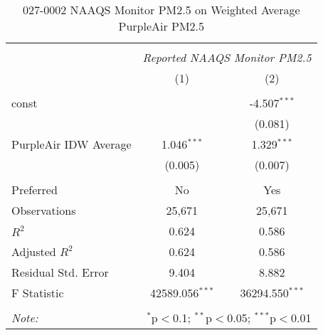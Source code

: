 \begin{table}[!htbp] \centering
  \caption{027-0002 NAAQS Monitor PM2.5 on Weighted Average PurpleAir PM2.5}
  \label{tab:reg_027-0002}
\begin{tabular}{@{\extracolsep{5pt}}lcc}
\\[-1.8ex]\hline
\hline \\[-1.8ex]
& \multicolumn{2}{c}{\textit{Reported NAAQS Monitor PM2.5}} \
\cr \cline{2-3}
\\[-1.8ex] & (1) & (2) \\
\hline \\[-1.8ex]
 const & & -4.507$^{***}$ \\
  & & (0.081) \\
 PurpleAir IDW Average & 1.046$^{***}$ & 1.329$^{***}$ \\
  & (0.005) & (0.007) \\
\hline \\[-1.8ex]
 Preferred & No & Yes \\
 Observations & 25,671 & 25,671 \\
 $R^2$ & 0.624 & 0.586 \\
 Adjusted $R^2$ & 0.624 & 0.586 \\
 Residual Std. Error & 9.404 & 8.882  \\
 F Statistic & 42589.056$^{***}$  & 36294.550$^{***}$  \\
\hline
\hline \\[-1.8ex]
\textit{Note:} & \multicolumn{2}{r}{$^{*}$p$<$0.1; $^{**}$p$<$0.05; $^{***}$p$<$0.01} \\
\end{tabular}
\end{table}